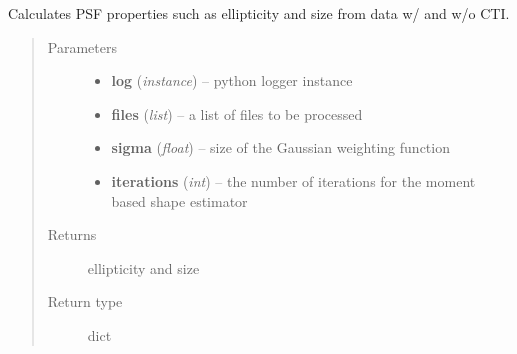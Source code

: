 \documentclass[a4paper,11pt,english]{sphinxmanual}
\begin{document}
\begin{fulllineitems}
\label{reduction:analysis.testCTIcorrection.testCTIcorrectionNonoise}
Calculates PSF properties such as ellipticity and size from data w/ and w/o CTI.
\begin{quote}\begin{description}
\item[{Parameters}] \leavevmode\begin{itemize}
\item {} 
\textbf{log} (\emph{instance}) -- python logger instance

\item {} 
\textbf{files} (\emph{list}) -- a list of files to be processed

\item {} 
\textbf{sigma} (\emph{float}) -- size of the Gaussian weighting function

\item {} 
\textbf{iterations} (\emph{int}) -- the number of iterations for the moment based shape estimator

\end{itemize}

\item[{Returns}] \leavevmode
ellipticity and size

\item[{Return type}] \leavevmode
dict

\end{description}\end{quote}

\end{fulllineitems}

\end{document}
